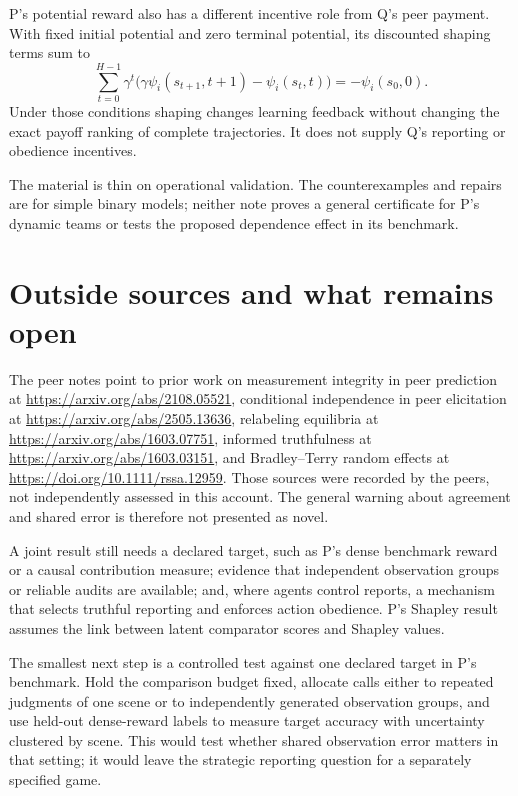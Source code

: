 \documentclass{article}
\begin{document}
P's potential reward also has a different incentive role from Q's peer payment. With fixed initial potential and zero terminal potential, its discounted shaping terms sum to
\[
\sum_{t=0}^{H-1}\gamma^t
\bigl(\gamma\psi_i(s_{t+1},t+1)-\psi_i(s_t,t)\bigr)
=-\psi_i(s_0,0).
\]
Under those conditions shaping changes learning feedback without changing the exact payoff ranking of complete trajectories. It does not supply Q's reporting or obedience incentives. 

The material is thin on operational validation. The counterexamples and repairs are for simple binary models; neither note proves a general certificate for P's dynamic teams or tests the proposed dependence effect in its benchmark. 

\section{Outside sources and what remains open}

The peer notes point to prior work on measurement integrity in peer prediction at \url{https://arxiv.org/abs/2108.05521}, conditional independence in peer elicitation at \url{https://arxiv.org/abs/2505.13636}, relabeling equilibria at \url{https://arxiv.org/abs/1603.07751}, informed truthfulness at \url{https://arxiv.org/abs/1603.03151}, and Bradley--Terry random effects at \url{https://doi.org/10.1111/rssa.12959}. Those sources were recorded by the peers, not independently assessed in this account. The general warning about agreement and shared error is therefore not presented as novel. 

A joint result still needs a declared target, such as P's dense benchmark reward or a causal contribution measure; evidence that independent observation groups or reliable audits are available; and, where agents control reports, a mechanism that selects truthful reporting and enforces action obedience. P's Shapley result assumes the link between latent comparator scores and Shapley values. 

The smallest next step is a controlled test against one declared target in P's benchmark. Hold the comparison budget fixed, allocate calls either to repeated judgments of one scene or to independently generated observation groups, and use held-out dense-reward labels to measure target accuracy with uncertainty clustered by scene. This would test whether shared observation error matters in that setting; it would leave the strategic reporting question for a separately specified game. 
\end{document}
